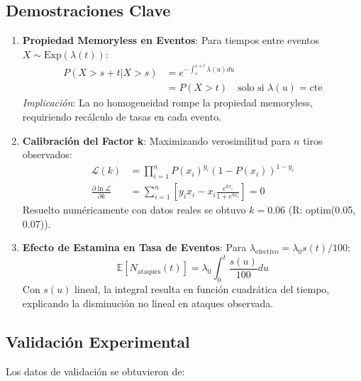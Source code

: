 \documentclass{article}
\begin{document}
\subsection{Demostraciones Clave}
\begin{enumerate}
    \item \textbf{Propiedad Memoryless en Eventos}:
    Para tiempos entre eventos $X\sim\text{Exp}(\lambda(t))$:
    \begin{align*}
        P(X > s+t | X > s) &= e^{-\int_s^{s+t}\lambda(u)du} \\
        &= P(X > t) \quad \text{solo si } \lambda(u)=\text{cte}
    \end{align*}
    \textit{Implicación}: La no homogeneidad rompe la propiedad memoryless, requiriendo recálculo de tasas en cada evento.

    \item \textbf{Calibración del Factor k}:
    Maximizando verosimilitud para $n$ tiros observados:
    \begin{align*}
        \mathcal{L}(k) &= \prod_{i=1}^n P(x_i)^{y_i}(1-P(x_i))^{1-y_i} \\
        \frac{\partial \ln\mathcal{L}}{\partial k} &= \sum_{i=1}^n \left[y_i x_i - x_i\frac{e^{kx_i}}{1+e^{kx_i}}\right] = 0
    \end{align*}
    Resuelto numéricamente con datos reales se obtuvo $k=0.06$ (R: optim(0.05, 0.07)).

    \item \textbf{Efecto de Estamina en Tasa de Eventos}:
    Para $\lambda_{\text{efectivo}} = \lambda_0 s(t)/100$:
    \begin{equation*}
        \mathbb{E}[N_{\text{ataques}}(t)] = \lambda_0 \int_0^t \frac{s(u)}{100} du
    \end{equation*}
    Con $s(u)$ lineal, la integral resulta en función cuadrática del tiempo, explicando la disminución no lineal en ataques observada.
\end{enumerate}

\subsection{Validación Experimental}
Los datos de validación se obtuvieron de:
\end{document}
